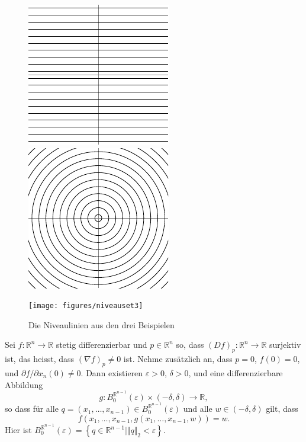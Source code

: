\documentclass[../main.tex]{subfiles}
\begin{document}
\begin{figure}[htb] 
  \centering
  \begin{minipage}{0.33\textwidth}
    \centering
    \includegraphics{figures/niveauset1}
  \end{minipage}%
  \begin{minipage}{0.33\textwidth}
    \centering
    \includegraphics{figures/niveauset2}
  \end{minipage}%
  \begin{minipage}{0.33\textwidth}
    \centering
    \texttt{[image: figures/niveauset3]}
  \end{minipage}%
  \caption{Die Niveaulinien aus den drei Beispielen}%
  \label{fig:niveausets}
\end{figure}

\begin{theorem}%
  \label{thm:implicit-special}
  Sei $f \colon \mathbb{R}^n \to \mathbb{R}$ 
  stetig differenzierbar und $p \in \mathbb{R}^n$ 
  so, dass ${(Df)}_p \colon \mathbb{R}^n \to \mathbb{R}$ surjektiv ist,
  das heisst, dass ${(\nabla f)}_p \neq 0$ ist.
  Nehme zusätzlich an, dass $p = 0$, $f(0) = 0$,
  und $\partial f/ \partial x_n (0) \neq 0$.
  Dann existieren $\varepsilon > 0$, $\delta > 0$,
  und eine differenzierbare Abbildung
  \[
  g \colon B_0^{\mathbb{R}^{n-1}}(\varepsilon) \times (-\delta, \delta)
  \to \mathbb{R},
  \]
  so dass für alle 
  $q = (x_1, \dots, x_{n-1}) \in B_0^{\mathbb{R}^{n-1}}(\varepsilon)$ 
  und alle $w \in (-\delta, \delta)$ gilt, dass
  \[
  f(x_1, \dots, x_{n-1}, g(x_1, \dots, x_{n-1}, w)) = w.
  \]
  Hier ist $B_0^{\mathbb{R}^{n-1}}(\varepsilon)
  = \left\{q \in\mathbb{R}^{n-1} \mid \Vert q \Vert_2 < \varepsilon \right\}$.
\end{theorem}
\end{document}
